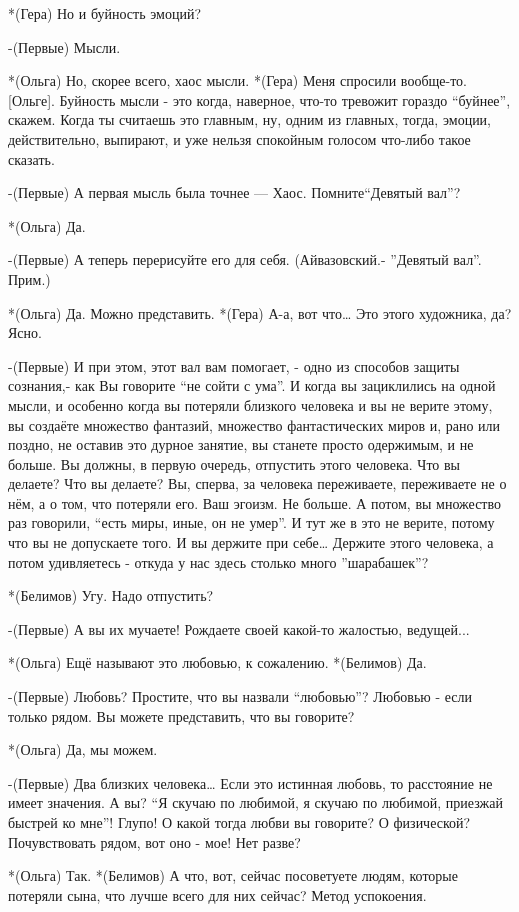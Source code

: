 *(Гера) Но и буйность эмоций?

-(Первые) Мысли.

*(Ольга) Но, скорее всего, хаос мысли.
*(Гера) Меня спросили вообще-то.[Ольге]. Буйность мысли - это когда, наверное, что-то тревожит гораздо “буйнее”, скажем. Когда ты считаешь это главным, ну, одним из главных, тогда, эмоции, действительно, выпирают, и уже нельзя спокойным голосом что-либо такое сказать.

-(Первые) А первая мысль была точнее — Хаос. Помните“Девятый вал”?

*(Ольга) Да.

-(Первые) А теперь перерисуйте его для себя. (Айвазовский.- ”Девятый вал”. Прим.)

*(Ольга) Да. Можно представить.
*(Гера) А-а, вот что…  Это этого художника, да? Ясно.

-(Первые) И при этом, этот вал вам помогает, - одно из способов защиты сознания,- как Вы говорите “не сойти с ума”. И когда вы зациклились на одной мысли, и особенно когда вы потеряли близкого человека и вы не верите этому, вы создаёте множество фантазий, множество фантастических миров и, рано или поздно, не оставив это дурное занятие,  вы станете просто одержимым, и не больше. Вы должны, в первую очередь, отпустить этого человека. Что вы делаете? Что вы делаете? Вы, сперва, за человека переживаете, переживаете не о нём, а о том, что потеряли его. Ваш эгоизм. Не больше. А потом, вы множество раз говорили, “есть миры, иные, он не умер”. И тут же в это не верите, потому что вы не допускаете того. И вы держите при себе… Держите этого человека, а потом удивляетесь - откуда у нас здесь столько много ”шарабашек”?

*(Белимов) Угу. Надо отпустить?

-(Первые) А вы их мучаете! Рождаете своей какой-то жалостью, ведущей...

*(Ольга) Ещё называют это любовью, к сожалению.
*(Белимов) Да.

-(Первые) Любовь? Простите, что вы назвали “любовью”? Любовью - если только рядом. Вы можете представить, что вы говорите?

*(Ольга) Да, мы можем.

-(Первые) Два близких человека… Если это истинная любовь, то расстояние не имеет значения. А вы? “Я скучаю по любимой, я скучаю по любимой, приезжай быстрей ко мне”! Глупо! О какой тогда любви вы говорите? О физической? Почувствовать рядом, вот оно - мое! Нет разве?

*(Ольга) Так.
*(Белимов) А что, вот, сейчас посоветуете людям, которые потеряли сына, что лучше всего для них сейчас? Метод успокоения.

